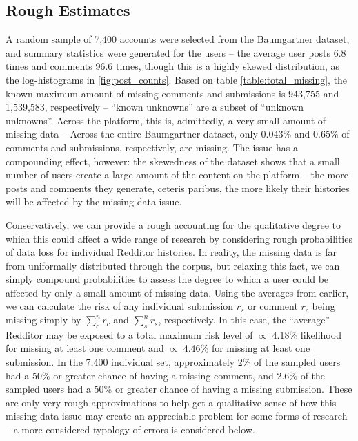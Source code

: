 \documentclass[letterpaper,12pt]{article}
\begin{document}
\subsection{Rough Estimates}

A random sample of 7,400 accounts were selected from the Baumgartner dataset, and summary statistics were generated for the users -- the average user posts 6.8 times and comments 96.6 times, though this is a highly skewed distribution, as the log-histograms in \ref{fig:post_counts}. Based on table \ref{table:total_missing}, the known maximum amount of missing comments and submissions is 943,755 and 1,539,583, respectively -- ``known unknowns'' are a subset of ``unknown unknowns''. Across the platform, this is, admittedly, a very small amount of missing data -- Across the entire Baumgartner dataset, only 0.043$\%$ and 0.65$\%$ of comments and submissions, respectively, are missing. The issue has a compounding effect, however: the skewedness of the dataset shows that a small number of users create a large amount of the content on the platform -- the more posts and comments they generate, ceteris paribus, the more likely their histories will be affected by the missing data issue.

Conservatively, we can provide a rough accounting for the qualitative degree to which this could affect a wide range of research by considering rough probabilities of data loss for individual Redditor histories. In reality, the missing data is far from uniformally distributed through the corpus, but relaxing this fact, we can simply compound probabilities to assess the degree to which a user could be affected by only a small amount of missing data. Using the averages from earlier, we can calculate the risk of any individual submission $r_s$ or comment $r_c$ being missing  simply by $\sum_c^n r_c$ and $\sum_s^n r_s$, respectively. In this case, the ``average'' Redditor may be exposed to a total maximum risk level of $\propto$ 4.18$\%$ likelihood for missing at least one comment and $\propto$ 4.46$\%$ for missing at least one submission. In the 7,400 individual set, approximately 2$\%$ of the sampled users had a 50$\%$ or greater chance of having a missing comment, and 2.6$\%$ of the sampled users had a 50$\%$ or greater chance of having a missing submission. These are only very rough approximations to help get a qualitative sense of how this missing data issue may create an appreciable problem for some forms of research -- a more considered typology of errors is considered below.
\end{document}

